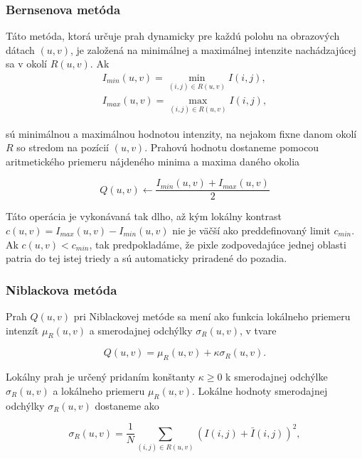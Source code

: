 \documentclass[a4paper,11pt,oneside]{article}%
\begin{document}
\subsubsection{Bernsenova metóda} \label{bernsenM}

Táto metóda, ktorá určuje prah dynamicky pre každú polohu na obrazových dátach $(u,v)$, je založená na minimálnej a maximálnej intenzite nachádzajúcej sa v okolí $R(u,v)$. Ak 
\begin{equation}
\begin{array}{l}
I_{min}(u,v) = \min\limits_{(i,j)\in R(u,v)} I(i,j),  \\
I_{max}(u,v) = \max\limits_{(i,j)\in R(u,v)} I(i,j),
\end{array}
\end{equation}

sú minimálnou a maximálnou hodnotou intenzity, na nejakom fixne danom okolí $R$ so stredom na pozícií $(u,v)$. Prahovú hodnotu dostaneme pomocou aritmetického priemeru nájdeného minima a maxima daného okolia 

\begin{equation}
Q(u,v) \gets \frac{I_{min}(u,v) + I_{max}(u,v)}{2}
\end{equation}

Táto operácia je vykonávaná tak dlho, až kým lokálny kontrast $c(u, v) = I_{max}(u, v) − I_{min}(u, v)$ nie je väčší ako preddefinovaný limit $c_{min}$. Ak $c(u, v) < c_{min}$, tak predpokladáme, že pixle zodpovedajúce jednej oblasti patria do tej istej triedy a sú automaticky priradené do pozadia. 

\subsubsection{Niblackova metóda} \label{niblack} 

Prah $Q(u, v)$ pri Niblackovej metóde sa mení ako funkcia lokálneho priemeru intenzít $\mu_R(u,v)$ a smerodajnej odchýlky $\sigma_R(u,v)$, v tvare

\begin{equation} \label{eq:nbO}
Q(u,v) = \mu_R(u,v) + \kappa\sigma_R(u,v).
\end{equation}

Lokálny prah je určený pridaním konštanty $\kappa \geq 0$ k smerodajnej odchýlke $\sigma_R(u,v)$ a lokálneho priemeru $\mu_R(u,v)$. Lokálne hodnoty smerodajnej odchýlky $\sigma_R(u,v)$ dostaneme ako 

\begin{equation} 
\sigma_R(u,v) = \frac{1}{N} \sum_{(i,j) \in R(u,v)} (I(i,j) + \bar{I}(i,j))^2,
\end{equation}
\end{document}
